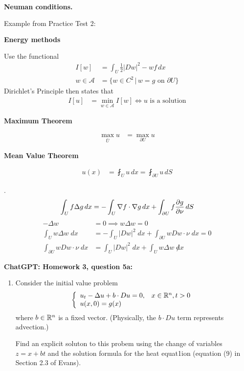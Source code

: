 \documentclass[12pt,a4paper]{report}
\begin{document}
\begin{description}
	\item \textbf{Neuman conditions.}
	
	Example from Practice Test 2:
	
	\item \textbf{Energy methods}
	
	Use the functional 
	\begin{align*}
		I[w] &= \int_U \frac{1}{2}|Dw|^2-wf\, dx \\
		w \in \mathcal{A} &= \{ w \in C^2\,|\, w=g \text{ on } \partial U\}
	\end{align*}Dirichlet's Principle then states that
	\begin{align*}
		I[u] &= \min_{w \in \mathcal{A}} I[w] \iff u \text{ is a solution}
	\end{align*}
	
	\item \textbf{Maximum Theorem}
	
	\begin{align*}
		\max_{\bar U} u &= \max_{\partial U} u
	\end{align*}
	
	\item \textbf{Mean Value Theorem}
	
	\begin{align*}
		u(x) &= \fint_U u\, dx = \fint_{\partial U} u \,dS
	\end{align*}
\end{description}

\HLINE
\begin{remark}.
\begin{align*}
	\int_U f\Delta g\, dx = -\int_U \nabla f \cdot \nabla g \, dx + \int_{\partial U} f \frac{\partial g}{\partial \nu}\, dS
\end{align*}
\begin{align*}
	-\Delta w &= 0 \implies w\Delta w = 0\\
	\int_U w\Delta w\; dx &= -\int_U |Dw|^2\;  dx+\int_{\partial U}wDw\cdot \nu\;  dx = 0\\
	\int_{\partial U} wDw\cdot \nu\;  dx &= \int_U |Dw|^2\;  dx + \int_U w\Delta w\;  \not dx
\end{align*}
\end{remark}

\newpage
\textbf{ChatGPT: Homework 3, question 5a: }

\begin{enumerate}[label=5(a)]
	\item Consider the initial value problem 
	\begin{align*}
		\left \{ \begin{array}{ll} u_t-\Delta u+b\cdot Du=0, & x\in \mathbb{R}^n, t>0\\ u(x,0)=g(x)  \end{array} \right .
	\end{align*}where $b \in \mathbb{R}^n$ is a fixed vector. (Physically, the $b\cdot  Du$ term represents advection.)
	
	Find an explicit soluton to this probem using the  change of variables $z=x+bt$ and the solution formula for the heat equat1ion (equation (9) in Section 2.3 of Evans).
	
\end{enumerate}
\end{document}

